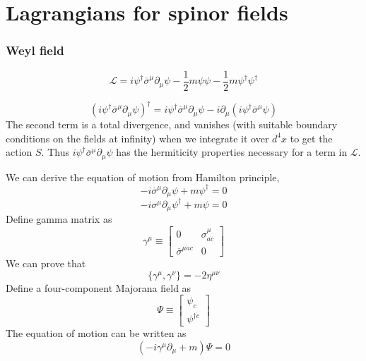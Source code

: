 \section{Lagrangians for spinor fields}
\subsubsection{Weyl field}
\[\mathcal{L} = i \psi^{\dagger} \overline{\sigma}^{\mu} \partial_{\mu} \psi - \frac{1}{2}m \psi \psi - \frac{1}{2}m \psi^{\dagger} \psi^{\dagger}\]
\begin{note}
\[(i \psi^{\dagger} \overline{\sigma}^{\mu} \partial_{\mu} \psi)^{\dagger} = i \psi^{\dagger} \overline{\sigma}^{\mu} \partial_{\mu} \psi -i \partial_{\mu}(i \psi^{\dagger} \overline{\sigma}^{\mu} \psi)\]
The second term is a total divergence, and vanishes (with suitable boundary conditions on the fields at infinity) when we integrate it over $d^4 x$ to get the action $S$. Thus $i \psi^{\dagger} \overline{\sigma}^{\mu} \partial_{\mu} \psi$  has the hermiticity properties necessary for a term in $\mathcal{L}$.
\end{note}
\noindent
We can derive the equation of motion from Hamilton principle,
\[-i\overline{\sigma}^{\mu} \partial_{\mu} \psi + m \psi^{\dagger} = 0\]
\[-i\sigma^{\mu} \partial_{\mu} \psi^{\dagger} + m \psi = 0\]
Define gamma matrix as
\[\gamma^{\mu} \equiv \left[ \begin{matrix} 0& \sigma^{\mu}_{a\dot{c}}\\ \overline{\sigma}^{\mu\dot{a}c}& 0\end{matrix} \right] \]
We can prove that
\[\{\gamma^{\mu},\gamma^{\nu}\} = -2\eta^{\mu\nu}\]
Define a four-component Majorana field as
\[\Psi \equiv \left[ \begin{matrix} \psi_c \\ \psi^{\dagger \dot{c}}\end{matrix} \right] \]
The equation of motion can be written as
\[(-i\gamma^{\mu}\partial_{\mu}+m)\Psi=0\]


